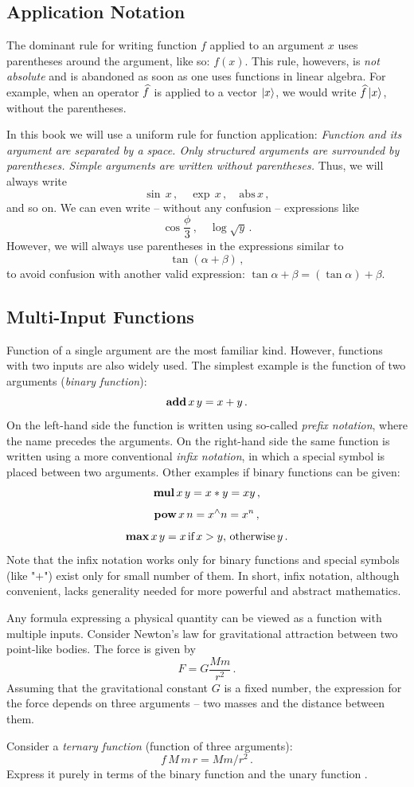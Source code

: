 \subsection{Application Notation}
The dominant rule for writing function $f$ applied to an argument $x$ uses parentheses around the argument, like so: $f(x)$. This rule, howevers, is \emph{not absolute} and is abandoned as soon as one uses functions in linear algebra. For example, when an operator $\widehat{f}$ is applied to a vector $|{x}\rangle$, we would write $\widehat{f}\,|{x}\rangle$, without the parentheses. 

In this book we will use a uniform rule for function application: \emph{Function and its argument are separated by a space. Only structured arguments are surrounded by parentheses. Simple arguments are written without parentheses.} Thus, we will always write
\[
\sin\,x\,,\quad \exp\, x\,,\quad \textrm{abs}\,x\,, 
\]
and so on. We can even write -- without any confusion -- expressions like
\[
\cos\frac{\phi}{3}\,,\quad\log\sqrt{y}\,.
\]
However, we will always use parentheses in the expressions similar to
\[
	\tan (\alpha+\beta)\,,
\]
to avoid confusion with another valid expression: $\tan \alpha+\beta=(\tan \alpha)+\beta$.

\subsection{Multi-Input Functions}
Function of a single argument are the most familiar kind. However, functions with two inputs are also widely used. The simplest example is the function of two arguments (\emph{binary function}):
\[
\textrm{\bf {add}}\,x\,y = x + y\,.
\]
On the left-hand side the function is written using so-called \emph{prefix notation}, where the name precedes the arguments. On the right-hand side the same function is written using a more conventional \emph{infix notation}, in which a special symbol is placed between two arguments. Other examples if binary functions can be given:
\[
\textrm{\bf {mul}}\,x\,y = x * y=xy\,,
\]
\[
\textrm{\bf {pow}}\,x\,n = x^\wedge n =x^n\,,
\]
\[
\textrm{\bf {max}}\,x\,y = x\,\textrm{if}\,x>y,\,\textrm{otherwise}\,y\,.
\]
Note that the infix notation works only for binary functions and special symbols (like "$+$") exist only for small number of them. In short, infix notation, although convenient, lacks generality needed for more powerful and abstract mathematics.

Any formula expressing a physical quantity can be viewed as a function with multiple inputs. Consider Newton's law for gravitational attraction between two point-like bodies. The force is given by
\[
F = G\frac{Mm}{r^2}\,.
\]
Assuming that the gravitational constant $G$ is a fixed number, the expression for the force depends on three arguments -- two masses and the distance between them. 
\begin{exercise}
	Consider a \emph{ternary function} (function of three arguments):
	\[
	f\,M\,m\,r=Mm/r^2\,.
	\]
	Express it purely in terms of the binary function  and the unary function .
	\label{exe:ternaryFunction}
\end{exercise}

